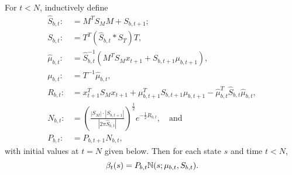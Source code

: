 \documentclass[12pt,leqno]{article}
\begin{document}
\begin{Thm}\label{beta:1}
  For $t < N$, inductively define
\begin{align*}
  \hat{S}_{b,t} :&= M^TS_MM + S_{b,t+1};\\
  S_{b,t} :&= T^T(\hat{S}_{b,t}*S_T)T,\\
  \hat{\mu}_{b,t} :&= \hat{S}_{b,t}^{-1}(M^TS_Mx_{t+1} + S_{b,t+1}\mu_{b,t+1}),\\
  \mu_{b,t} :&= T^{-1}\hat{\mu}_{b,t},\\
  R_{b,t} :&= x_{t+1}^TS_Mx_{t+1} + \mu_{b,t+1}^TS_{b,t+1}\mu_{b,t+1} - \hat{\mu}_{b,t}^T\hat{S}_{b,t}\hat{\mu}_{b,t},\\
  N_{b,t} :&= \left(\frac{|S_M|\cdot|S_{b,t+1}|}{|2\pi\hat{S}_{b,t}|}\right)^{\frac{1}{2}}e^{-\frac{1}{2}R_{b,t}},\quad\text{and}\\
  P_{b,t}:&=P_{b,t+1}N_{b,t},
\end{align*}
with initial values at $t = N$ given below. Then for each state $s$ and time $t < N$,
$$
  \beta_t(s) = P_{b,t}{\mathbb N}(s;\mu_{b,t},S_{b,t}).
$$
\end{Thm}
\end{document}
